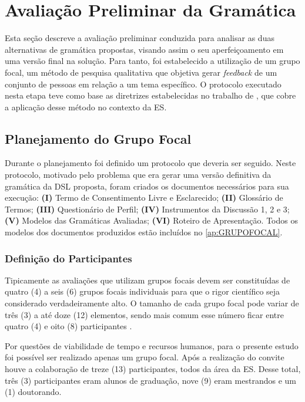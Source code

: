 \section{Avaliação Preliminar da Gramática} \label{sec:reqDSL}
Esta seção descreve a avaliação preliminar conduzida para analisar as duas alternativas de gramática propostas, visando assim o seu aperfeiçoamento em uma versão final na solução. 
Para tanto, foi estabelecido a utilização de um grupo focal, um método de pesquisa qualitativa que objetiva gerar \textit{feedback} de um conjunto de pessoas em relação a um tema específico. 
O protocolo executado nesta etapa teve como base as diretrizes estabelecidas no trabalho de , que cobre a aplicação desse método no contexto da \ac{ES}. 

\subsection{Planejamento do Grupo Focal}

Durante o planejamento foi definido um protocolo que deveria ser seguido.
Neste protocolo, motivado pelo problema que era gerar uma versão definitiva da gramática da \ac{DSL} proposta, foram criados os documentos necessários para sua execução: \textbf{(I)} Termo de Consentimento Livre e Esclarecido; \textbf{(II)} Glossário de Termos; \textbf{(III)} Questionário de Perfil; \textbf{(IV)} Instrumentos da Discussão 1, 2 e 3; \textbf{(V)} Modelos das Gramáticas Avaliadas; \textbf{(VI)} Roteiro de Apresentação. 
Todos os modelos dos documentos produzidos estão incluídos no \autoref{ap:GRUPOFOCAL}.

\subsubsection{Definição do Participantes}

Tipicamente as avaliações que utilizam grupos focais devem ser constituídas de quatro (4) a seis (6) grupos focais individuais para que o rigor científico seja considerado verdadeiramente alto. 
O tamanho de cada grupo focal pode variar de três (3) a até doze (12) elementos, sendo mais comum esse número ficar entre quatro (4) e oito (8) participantes \cite{Kontio:2008}. 

Por questões de viabilidade de tempo e recursos humanos, para o presente estudo foi possível ser realizado apenas um grupo focal. 
Após a realização do convite houve a colaboração de treze (13) participantes, todos da área da \ac{ES}. 
Desse total, três (3) participantes eram alunos de graduação, nove (9) eram mestrandos e um (1) doutorando. 


